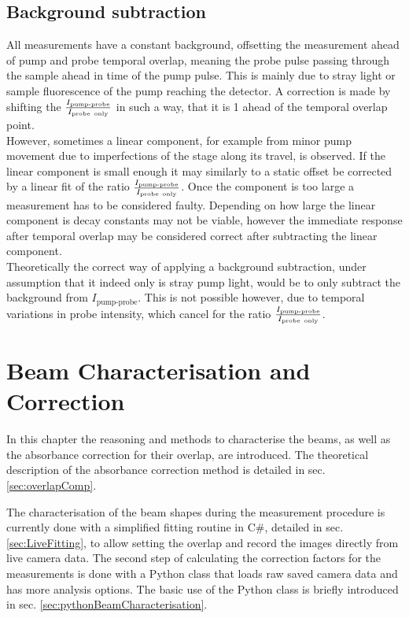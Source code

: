 \documentclass[twoside,openright,listof=numbered]{scrreprt}
\begin{document}
\section{Background subtraction}
All measurements have a constant background, offsetting the measurement ahead of pump and probe temporal overlap, meaning the probe pulse passing through the sample ahead in time of the pump pulse. This is mainly due to stray light or sample fluorescence of the pump reaching the detector.  A correction is made by shifting the ${\frac{I_\text{pump-probe}}{I_\text{probe\, only}}}$ in such a way, that it is 1 ahead of the temporal overlap point. \\
However, sometimes a linear component, for example from minor pump movement due to imperfections of the stage along its travel, is observed. If the linear component is small enough it may similarly to a static offset be corrected by a linear fit of the ratio ${\frac{I_\text{pump-probe}}{I_\text{probe\, only}}}$. Once the component is too large a measurement has to be considered faulty. Depending on how large the linear component is decay constants may not be viable, however the immediate response after temporal overlap may be considered correct after subtracting the linear component.\\

Theoretically the correct way of applying a background subtraction, under assumption that it indeed only is stray pump light, would be to only subtract the background from ${I_\text{pump-probe}}$. This is not possible however, due to temporal variations in probe intensity, which cancel for the ratio ${\frac{I_\text{pump-probe}}{I_\text{probe\, only}}}$.



\chapter{Beam Characterisation and Correction}\label{chp:OverlapCorrection}
In this chapter the reasoning and methods to characterise the beams, as well as the absorbance correction for their overlap, are introduced. The theoretical description of the absorbance correction method is detailed in sec. \ref{sec:overlapComp}.

The characterisation of the beam shapes during the measurement procedure is currently done with a simplified fitting routine in C\#, detailed in sec. \ref{sec:LiveFitting}, to allow setting the overlap and record the images directly from live camera data. The second step of calculating the correction factors for the measurements is done with a Python class that loads raw saved camera data and has more analysis options. The basic use of the Python class is briefly introduced in sec. \ref{sec:pythonBeamCharacterisation}.
\end{document}
